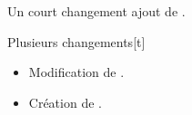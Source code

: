 \begin{bdoctopic}{Un court changement}
    ajout de .
\end{bdoctopic}

\begin{bdoctopic}{Plusieurs changements}[t] %
    \begin{itemize}
        \item Modification de .
        \item Création de .
    \end{itemize}
\end{bdoctopic}

